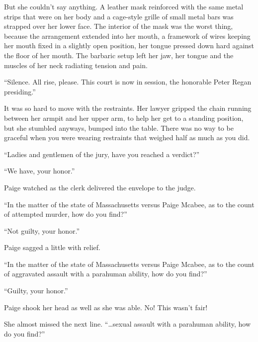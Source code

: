 But she couldn't say anything.  A leather mask reinforced with the same metal strips that were on her body and a cage-style grille of small metal bars was strapped over her lower face.  The interior of the mask was the worst thing, because the arrangement extended into her mouth, a framework of wires keeping her mouth fixed in a slightly open position, her tongue pressed down hard against the floor of her mouth.  The barbaric setup left her jaw, her tongue and the muscles of her neck radiating tension and pain.



``Silence.  All rise, please.  This court is now in session, the honorable Peter Regan presiding.''



It was so hard to move with the restraints.  Her lawyer gripped the chain running between her armpit and her upper arm, to help her get to a standing position, but she stumbled anyways, bumped into the table.  There was no way to be graceful when you were wearing restraints that weighed half as much as you did.



``Ladies and gentlemen of the jury, have you reached a verdict?''



``We have, your honor.''



Paige watched as the clerk delivered the envelope to the judge.



``In the matter of the state of Massachusetts versus Paige Mcabee, as to the count of attempted murder, how do you find?''



``Not guilty, your honor.''



Paige sagged a little with relief.



``In the matter of the state of Massachusetts versus Paige Mcabee, as to the count of aggravated assault with a parahuman ability, how do you find?''



``Guilty, your honor.''



Paige shook her head as well as she was able.  No!  This wasn't fair!



She almost missed the next line.  ``\ldots{}sexual assault with a parahuman ability, how do you find?''



